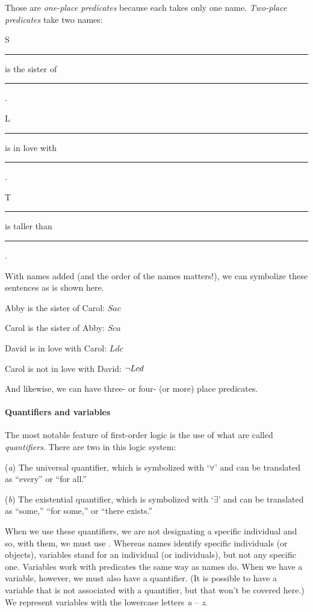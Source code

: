 Those are \textit{one-place predicates} because each takes only one name. \textit{Two-place predicates} take two names:
\begin{ekey}
	\item[S] \rule{1cm}{0.15mm} is the sister of \rule{1cm}{0.15mm} .
	\item[L] \rule{1cm}{0.15mm} is in love with \rule{1cm}{0.15mm} .
	\item[T] \rule{1cm}{0.15mm} is taller than \rule{1cm}{0.15mm} .
\end{ekey}
With names added (and the order of the names matters!), we can symbolize these sentences as is shown here.

\begin{ebullet}
	\item[] Abby is the sister of Carol: $Sac$
	\item[] Carol is the sister of Abby: $Sca$
	\item[] David is in love with Carol: $Ldc$
	\item[] Carol is not in love with David: ${\neg} Lcd$
\end{ebullet}
And likewise, we can have three- or four- (or more) place predicates. 


\paragraph{Quantifiers and variables}

The most notable feature of first-order logic is the use of what are called \textit{quantifiers}. There are two in this logic system:

\begin{ebullet}
	\item[(\textit{a})] The universal quantifier, which is symbolized with `$\forall$' and can be translated as ``every'' or ``for all.''
	\item[(\textit{b})] The existential quantifier, which is symbolized with `$\exists$' and can be translated as ``some,'' ``for some,'' or ``there exists.''
\end{ebullet}

When we use these quantifiers, we are not designating a specific individual and so, with them, we must use . Whereas names identify specific individuals (or objects), variables stand for an individual (or individuals), but not any specific one. Variables work with predicates the same way as names do. When we have a variable, however, we must also have a quantifier. (It is possible to have a variable that is not associated with a quantifier, but that won't be covered here.) We represent variables with the lowercase letters \textit{u} -- \textit{z}.

